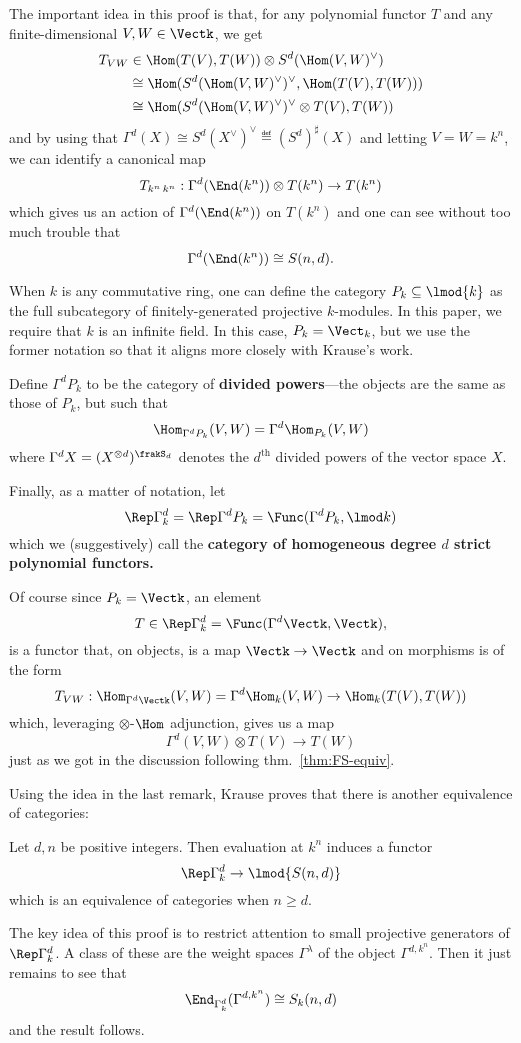 \documentclass[12pt]{article}
\begin{document}
	The important idea in this proof is that, for any polynomial functor $T$ and any finite-dimensional $V,W\in\Vectk$,
	we get 
	\begin{align*}T_{VW}&\in\Hom(T(V),T(W))\otimes S^d(\Hom(V,W)^\vee)\\
		&\cong\Hom(S^d(\Hom(V,W)^\vee)^\vee,\Hom(T(V),T(W)))\\
		&\cong\Hom(S^d(\Hom(V,W)^\vee)^\vee\otimes T(V),T(W))
	\end{align*}
	and by using that $\Gamma^d(X)\cong S^d(X^\vee)^\vee\eqdef (S^d)^\sharp(X)$ and letting $V=W=k^n$, we can identify a canonical map 
	\[T_{k^n\,k^n}:\Gamma^d(\End(k^n))\otimes T(k^n)\to T(k^n)\]
	which gives us an action of $\Gamma^d(\End(k^n))$ on $T(k^n)$ and one can see without too much trouble that 
	\[\Gamma^d(\End(k^n))\cong S(n,d).\]

	\begin{defn}\label{defn:div-powers}
		When $k$ is any commutative ring, one can define the category $P_k\subseteq \lmod{k}$ as the full subcategory of finitely-generated projective $k$-modules.
		In this paper, we require that $k$ is an infinite field. In this case, $P_k=\Vect_k$, but we use the former notation so that 
		it aligns more closely with Krause's work.
	
		Define $\Gamma^d P_k$ to be the category of \textbf{divided powers}---the objects are the same as those of $P_k$, but such that 
		\[\Hom_{\Gamma^dP_k}(V,W)=\Gamma^d\Hom_{P_k}(V,W)\]
		where $\Gamma^d X=(X^{\otimes d})^{\frakS_d}$ denotes the \textbf{$d^{\text{th}}$} divided powers of the vector space $X$.
	
		Finally, as a matter of notation, let 
		\[\Rep\Gamma^d_k=\Rep\Gamma^dP_k=\Func(\Gamma^dP_k,\lmod k)\]
		which we (suggestively) call the \textbf{category of homogeneous degree $d$ strict polynomial functors.}
	\end{defn}
	\begin{rmk}\label{rmk:action}
		Of course since $P_k=\Vectk$, an element
		\[T\in\Rep\Gamma^d_k=\Func(\Gamma^d\Vectk,\Vectk),\]
		is a functor that, on objects, is a map $\Vectk\to \Vectk$ and on morphisms is of the form 
		\[T_{VW}:\Hom_{\Gamma^d\Vectk}(V,W)=\Gamma^d\Hom_k(V,W)\to \Hom_k(T(V),T(W))\]
		which, leveraging $\otimes$-$\Hom$ adjunction, gives us a map 
		\[\Gamma^d(V,W)\otimes T(V)\to T(W)\]
		just as we got in the discussion following thm.~\ref{thm:FS-equiv}.
	\end{rmk}
	Using the idea in the last remark, Krause proves that there is another equivalence of categories:
	\begin{thm}
		Let $d,n$ be positive integers. Then evaluation at $k^n$ induces a functor 
		\[\Rep\Gamma^d_k\to \lmod{S(n,d)}\]
		which is an equivalence of categories when $n\ge d$.
	\end{thm}
	The key idea of this proof is to restrict attention to small projective generators of $\Rep\Gamma^d_k$. A class of these 
	are the weight spaces $\Gamma^\lambda$ of the object $\Gamma^{d,k^n}$. Then it just remains to see that 
	\[\End_{\Gamma^d_k}(\Gamma^{d,k^n})\cong S_k(n,d)\]
	and the result follows.	
\end{document}
